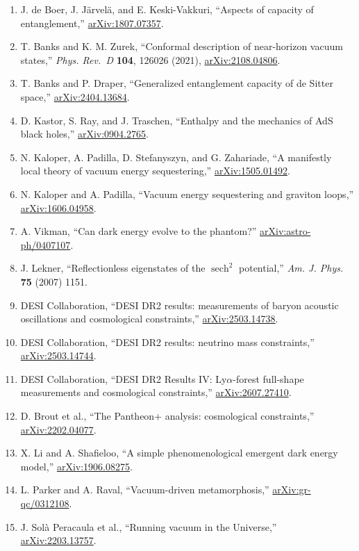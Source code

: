 \documentclass[
  11pt,
  letterpaper,
]{article}
\begin{document}
\begin{enumerate}
  M. Akbar and R.-G. Cai, ``Thermodynamic behavior of Friedmann equation
  at apparent horizon of FRW universe,''
  \href{https://arxiv.org/abs/hep-th/0609128}{arXiv:hep-th/0609128}.
\item
  J. de Boer, J. Järvelä, and E. Keski-Vakkuri, ``Aspects of capacity of
  entanglement,''
  \href{https://arxiv.org/abs/1807.07357}{arXiv:1807.07357}.
\item
  T. Banks and K. M. Zurek, ``Conformal description of near-horizon
  vacuum states,'' \emph{Phys. Rev.~D} \textbf{104}, 126026 (2021),
  \href{https://arxiv.org/abs/2108.04806}{arXiv:2108.04806}.
\item
  T. Banks and P. Draper, ``Generalized entanglement capacity of de
  Sitter space,''
  \href{https://arxiv.org/abs/2404.13684}{arXiv:2404.13684}.
\item
  D. Kastor, S. Ray, and J. Traschen, ``Enthalpy and the mechanics of
  AdS black holes,''
  \href{https://arxiv.org/abs/0904.2765}{arXiv:0904.2765}.
\item
  N. Kaloper, A. Padilla, D. Stefanyszyn, and G. Zahariade, ``A
  manifestly local theory of vacuum energy sequestering,''
  \href{https://arxiv.org/abs/1505.01492}{arXiv:1505.01492}.
\item
  N. Kaloper and A. Padilla, ``Vacuum energy sequestering and graviton
  loops,'' \href{https://arxiv.org/abs/1606.04958}{arXiv:1606.04958}.
\item
  A. Vikman, ``Can dark energy evolve to the phantom?''
  \href{https://arxiv.org/abs/astro-ph/0407107}{arXiv:astro-ph/0407107}.
\item
  J. Lekner, ``Reflectionless eigenstates of the
  \(\operatorname{sech}^2\) potential,'' \emph{Am. J. Phys.} \textbf{75}
  (2007) 1151.
\item
  DESI Collaboration, ``DESI DR2 results: measurements of baryon
  acoustic oscillations and cosmological constraints,''
  \href{https://arxiv.org/abs/2503.14738}{arXiv:2503.14738}.
\item
  DESI Collaboration, ``DESI DR2 results: neutrino mass constraints,''
  \href{https://arxiv.org/abs/2503.14744}{arXiv:2503.14744}.
\item
  DESI Collaboration, ``DESI DR2 Results IV: Ly\(\alpha\)-forest
  full-shape measurements and cosmological constraints,''
  \href{https://arxiv.org/abs/2607.27410}{arXiv:2607.27410}.
\item
  D. Brout et al., ``The Pantheon+ analysis: cosmological constraints,''
  \href{https://arxiv.org/abs/2202.04077}{arXiv:2202.04077}.
\item
  X. Li and A. Shafieloo, ``A simple phenomenological emergent dark
  energy model,''
  \href{https://arxiv.org/abs/1906.08275}{arXiv:1906.08275}.
\item
  L. Parker and A. Raval, ``Vacuum-driven metamorphosis,''
  \href{https://arxiv.org/abs/gr-qc/0312108}{arXiv:gr-qc/0312108}.
\item
  J. Solà Peracaula et al., ``Running vacuum in the Universe,''
  \href{https://arxiv.org/abs/2203.13757}{arXiv:2203.13757}.
\end{enumerate}
\end{document}
